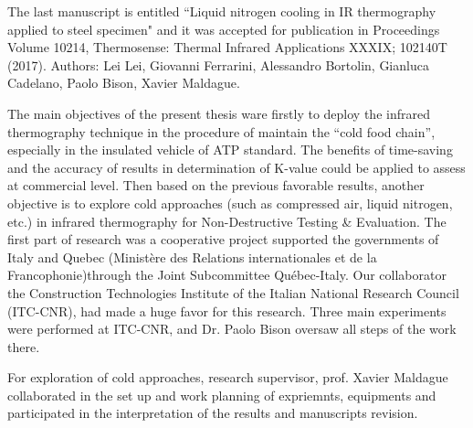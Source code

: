The last manuscript is entitled ``Liquid nitrogen cooling in IR thermography applied to steel specimen" and it was accepted for publication in Proceedings Volume 10214, Thermosense: Thermal Infrared Applications XXXIX; 102140T (2017). Authors: Lei Lei, Giovanni Ferrarini, Alessandro Bortolin, Gianluca Cadelano, Paolo Bison, Xavier Maldague.

The main objectives of the present thesis ware firstly to deploy the infrared thermography technique in the procedure of maintain the ``cold food chain'', especially in the insulated vehicle of ATP standard. The benefits of time-saving and the accuracy of results in determination of K-value could be applied to assess at commercial level. Then based on the previous favorable results, another objective is to explore cold approaches (such as compressed air, liquid nitrogen, etc.) in infrared thermography for Non-Destructive Testing \& Evaluation. The first part of research was a cooperative project supported the governments of Italy and Quebec (Ministère des Relations internationales et de la Francophonie)through the Joint Subcommittee Québec-Italy. Our collaborator the Construction Technologies Institute of the Italian National Research Council (ITC-CNR), had made a huge favor for this research. Three main experiments were performed at ITC-CNR, and Dr. Paolo Bison oversaw all steps of the work there.

For exploration of cold approaches, research supervisor, prof. Xavier Maldague collaborated in the set up and work planning of expriemnts, equipments and participated in the interpretation of the results and manuscripts revision.


